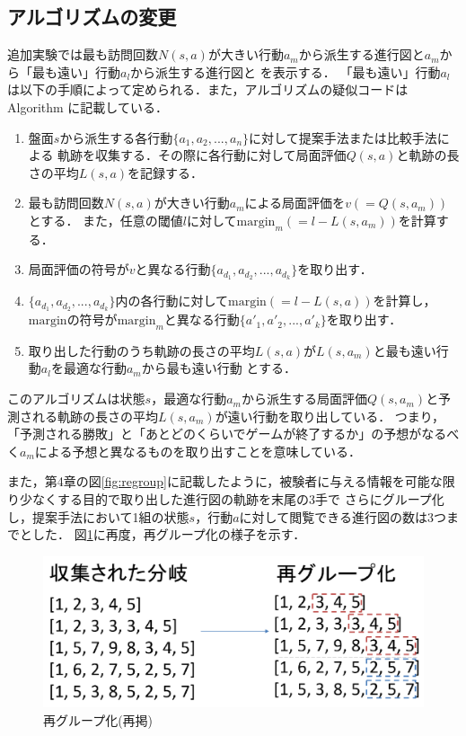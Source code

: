 \subsection{アルゴリズムの変更}
追加実験では最も訪問回数$N(s, a)$が大きい行動$a_m$から派生する進行図と$a_m$から「最も遠い」行動$a_l$から派生する進行図と
を表示する．
「最も遠い」行動$a_l$は以下の手順によって定められる．また，アルゴリズムの疑似コードはAlgorithm\label{alg:myalg-add} に記載している．
\begin{enumerate}
    \item 盤面$s$から派生する各行動$\{a_1, a_2, ..., a_n\}$に対して提案手法または比較手法による
    軌跡を収集する．その際に各行動に対して局面評価$Q(s, a)$と軌跡の長さの平均$L(s, a)$を記録する．
    \item 最も訪問回数$N(s, a)$が大きい行動$a_m$による局面評価を$v(=Q(s, a_m))$とする．
    また，任意の閾値$l$に対して$\textrm{margin}_m(=l-L(s, a_m))$を計算する．
    \item 局面評価の符号が$v$と異なる行動$\{a_{d_1}, a_{d_2}, ..., a_{d_k}\}$を取り出す．
    \item $\{a_{d_1}, a_{d_2}, ..., a_{d_k}\}$内の各行動に対して$\textrm{margin}(=l-L(s, a))$を計算し，
    $\textrm{margin}$の符号が$\textrm{margin}_m$と異なる行動$\{{a'}_{1}, {a'}_{2}, ..., {a'}_{k}\}$を取り出す．
    \item 取り出した行動のうち軌跡の長さの平均$L(s, a)$が$L(s, a_m)$と最も遠い行動$a_l$を最適な行動$a_m$から最も遠い行動
    とする．
\end{enumerate}
このアルゴリズムは状態$s$，最適な行動$a_m$から派生する局面評価$Q(s, a_m)$と予測される軌跡の長さの平均$L(s, a_m)$が遠い行動を取り出している．
つまり，「予測される勝敗」と「あとどのくらいでゲームが終了するか」の予想がなるべく$a_m$による予想と異なるものを取り出すことを意味している．

また，第4章の図\ref{fig:regroup}に記載したように，被験者に与える情報を可能な限り少なくする目的で取り出した進行図の軌跡を末尾の3手で
さらにグループ化し，提案手法において1組の状態$s$，行動$a$に対して閲覧できる進行図の数は3つまでとした．
図\ref{fig:re-regroup}に再度，再グループ化の様子を示す．
\begin{figure}[htbp]
	\centering
	\includegraphics[width=\linewidth]{./figure/regroup.pdf}
	\caption{再グループ化(再掲)}
	\label{fig:re-regroup}
\end{figure}

